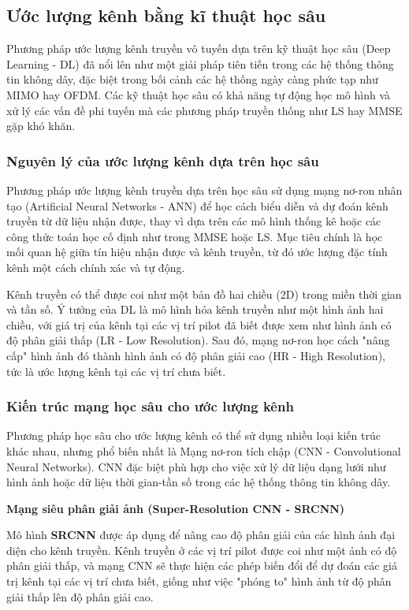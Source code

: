 \subsection{Ước lượng kênh bằng kĩ thuật học sâu}

Phương pháp ước lượng kênh truyền vô tuyến dựa trên kỹ thuật học sâu (Deep Learning - DL) đã nổi lên như một giải pháp tiên tiến trong các hệ thống thông tin không dây, 
đặc biệt trong bối cảnh các hệ thống ngày càng phức tạp như MIMO hay OFDM. 
Các kỹ thuật học sâu có khả năng tự động học mô hình và xử lý các vấn đề phi tuyến mà các phương pháp truyền thống như LS hay MMSE gặp khó khăn. 

\subsubsection{Nguyên lý của ước lượng kênh dựa trên học sâu}

Phương pháp ước lượng kênh truyền dựa trên học sâu sử dụng mạng nơ-ron nhân tạo (Artificial Neural Networks - ANN) để học cách biểu diễn và dự đoán kênh truyền từ dữ liệu nhận được, 
thay vì dựa trên các mô hình thống kê hoặc các công thức toán học cố định như trong MMSE hoặc LS. 
Mục tiêu chính là học mối quan hệ giữa tín hiệu nhận được và kênh truyền, từ đó ước lượng đặc tính kênh một cách chính xác và tự động.

Kênh truyền có thể được coi như một bản đồ hai chiều (2D) trong miền thời gian và tần số. 
Ý tưởng của DL là mô hình hóa kênh truyền như một hình ảnh hai chiều, với giá trị của kênh tại các vị trí pilot đã biết được xem như hình ảnh có độ phân giải thấp (LR - Low Resolution). 
Sau đó, mạng nơ-ron học cách "nâng cấp" hình ảnh đó thành hình ảnh có độ phân giải cao (HR - High Resolution), tức là ước lượng kênh tại các vị trí chưa biết.

\subsubsection{Kiến trúc mạng học sâu cho ước lượng kênh}

Phương pháp học sâu cho ước lượng kênh có thể sử dụng nhiều loại kiến trúc khác nhau, nhưng phổ biến nhất là Mạng nơ-ron tích chập (CNN - Convolutional Neural Networks). 
CNN đặc biệt phù hợp cho việc xử lý dữ liệu dạng lưới như hình ảnh hoặc dữ liệu thời gian-tần số trong các hệ thống thông tin không dây.

\textbf{Mạng siêu phân giải ảnh (Super-Resolution CNN - SRCNN)}

Mô hình \textbf{SRCNN} được áp dụng để nâng cao độ phân giải của các hình ảnh đại diện cho kênh truyền. 
Kênh truyền ở các vị trí pilot được coi như một ảnh có độ phân giải thấp, 
và mạng CNN sẽ thực hiện các phép biến đổi để dự đoán các giá trị kênh tại các vị trí chưa biết, 
giống như việc "phóng to" hình ảnh từ độ phân giải thấp lên độ phân giải cao.

